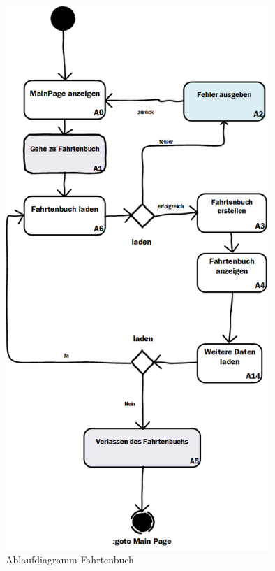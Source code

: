 \begin{figure}[H]
	\centering
	\includegraphics[width=10cm]{figures/Ablaufdiagramm_Fahrtenbuch_LD_APP.png}
	\caption{Ablaufdiagramm Fahrtenbuch}
	\label{fig:Ablaufdiagramm1}
\end{figure}

